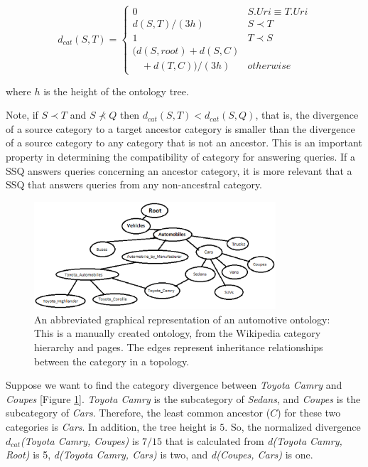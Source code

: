 \begin{equation}
d_{cat}(S, T) = \begin{cases}
0 & S.{Uri} \equiv T.{Uri}\\
d(S, T)/(3h) & S \prec T\\
1 & T \prec S\\
(d(S,root) + d(S,C) \\ \ \ \ \ + d(T,C))/(3h) & otherwise
\end{cases}
\end{equation}

\noindent where $h$ is the height of the ontology tree.

Note, if $S \prec T$ and $S \not\prec Q$ then $d_{cat}(S,T) <
d_{cat}(S,Q)$, that is, the divergence of a source category to a target
ancestor category is smaller than the divergence of a source category to any
category that is not an ancestor. This is an important property in
determining the compatibility of category for answering queries.  If a
SSQ answers queries concerning an ancestor category, it is more relevant
that a SSQ that answers queries from any non-ancestral category.

\begin{figure}[t]
\centering
\includegraphics[width=90mm]{img/automotive_ontology.eps}
\caption{An abbreviated graphical representation of an automotive
ontology: This is a manually created ontology, from the Wikipedia category
hierarchy and pages. The edges represent inheritance relationships between the
category in a topology.}
\label{fig:automotive_ontology}
\end{figure}

Suppose we want to find the category divergence between \textit{Toyota Camry}
and \textit{Coupes} [Figure \ref{fig:automotive_ontology}]. 
\textit{Toyota Camry} is the subcategory of \textit{Sedans}, and \textit{Coupes}
is the subcategory of \textit{Cars}. Therefore, the least common ancestor ($C$)
for these two categories is \textit{Cars}. In addition, the tree height is $5$.
So, the normalized divergence $d_{cat}$\textit{(Toyota Camry, Coupes)} is $7/15$
that is calculated from \textit{d(Toyota Camry, Root)} is 5, \textit{d(Toyota
Camry, Cars)} is two, and \textit{d(Coupes, Cars)} is one.


